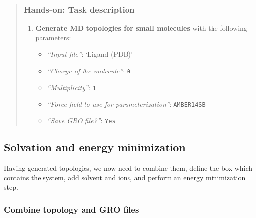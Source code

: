 \documentclass[twocolumn]{bmcart}%
\providecommand{\tightlist}{%
  \setlength{\itemsep}{0pt}\setlength{\parskip}{0pt}}
\providecommand{\tightlist}{%
  \setlength{\itemsep}{0pt}\setlength{\parskip}{0pt}}
\begin{document}
\begin{quote}
\subsubsection{Hands-on: Task
description}\label{hands-on-task-description-2}

\begin{enumerate}
\def\labelenumi{\arabic{enumi}.}
\tightlist
\item
  \textbf{Generate MD topologies for small molecules} with the following
  parameters:

  \begin{itemize}
  \tightlist
  \item
    \emph{``Input file''}: `Ligand (PDB)'
  \item
    \emph{``Charge of the molecule''}: \texttt{0}
  \item
    \emph{``Multiplicity''}: \texttt{1}
  \item
    \emph{``Force field to use for parameterization''}:
    \texttt{AMBER14SB}
  \item
    \emph{``Save GRO file?''}: \texttt{Yes}
  \end{itemize}
\end{enumerate}

\end{quote}

\subsection{Solvation and energy
minimization}\label{solvation-and-energy-minimization}

Having generated topologies, we now need to combine them, define the box
which contains the system, add solvent and ions, and perform an energy
minimization step.

\subsubsection{Combine topology and GRO
files}\label{combine-topology-and-gro-files}
\end{document}
